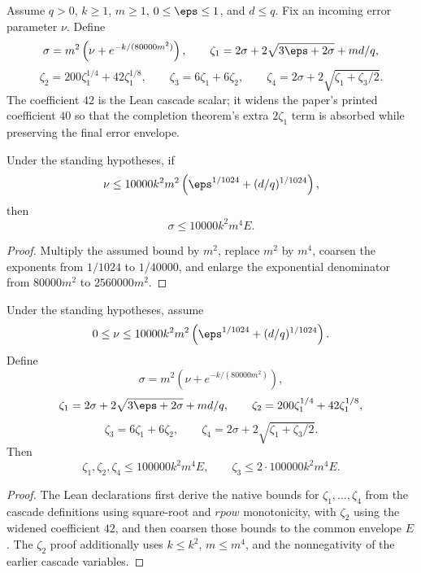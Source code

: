 \begin{definition}\label{def:main-formal-error-cascade}
	\leanok
	Assume $q > 0$, $k \ge 1$, $m \ge 1$, $0 \le \eps \le 1$, and $d \le q$. Fix an incoming error parameter $\nu$. Define
	\[
		\sigma = m^2\left(\nu + e^{-k/(80000m^2)}\right),
		\qquad
		\zeta_1 = 2\sigma + 2\sqrt{3\eps+2\sigma} + md/q,
	\]
	\[
		\zeta_2 = 200\zeta_1^{1/4} + 42\zeta_1^{1/8},
		\qquad
		\zeta_3 = 6\zeta_1 + 6\zeta_2,
		\qquad
		\zeta_4 = 2\sigma + 2\sqrt{\zeta_1+\zeta_3/2}.
	\]
	The coefficient $42$ is the Lean cascade scalar; it widens the paper's printed
	coefficient $40$ so that the completion theorem's extra $2\zeta_1$ term is
	absorbed while preserving the final error envelope.
\end{definition}

\begin{theorem}\label{thm:sigma-bound-main-formal}
	\leanok
	Under the standing hypotheses, if
	\[
		\nu \le 10000k^2m^2\left(\eps^{1/1024} + (d/q)^{1/1024}\right),
	\]
	then
	\[
		\sigma \le 10000k^2m^4 E.
	\]
\end{theorem}
\begin{proof}
	\leanok
	Multiply the assumed bound by $m^2$, replace $m^2$ by $m^4$, coarsen the exponents from $1/1024$ to $1/40000$, and enlarge the exponential denominator from $80000m^2$ to $2560000m^2$.
\end{proof}

\begin{theorem}\label{thm:zeta-bounds-main-formal}
	\leanok
	Under the standing hypotheses, assume
	\[
		0 \le \nu \le 10000k^2m^2\left(\eps^{1/1024} + (d/q)^{1/1024}\right).
	\]
	Define
	\[
		\sigma = m^2\left(\nu + e^{-k/(80000m^2)}\right),
	\]
	\[
		\zeta_1 = 2\sigma + 2\sqrt{3\eps + 2\sigma} + md/q,
		\qquad
		\zeta_2 = 200\zeta_1^{1/4} + 42\zeta_1^{1/8},
	\]
	\[
		\zeta_3 = 6\zeta_1 + 6\zeta_2,
		\qquad
		\zeta_4 = 2\sigma + 2\sqrt{\zeta_1 + \zeta_3/2}.
	\]
	Then
	\[
		\zeta_1, \zeta_2, \zeta_4 \le 100000k^2m^4 E,
		\qquad
		\zeta_3 \le 2 \cdot 100000k^2m^4 E.
	\]
\end{theorem}
\begin{proof}
	\leanok
	The Lean declarations first derive the native bounds for $\zeta_1,\dots,\zeta_4$
	from the cascade definitions using square-root and $rpow$ monotonicity, with
	$\zeta_2$ using the widened coefficient $42$, and then coarsen those bounds to
	the common envelope $E$. The $\zeta_2$ proof additionally uses $k \le k^2$,
	$m \le m^4$, and the nonnegativity of the earlier cascade variables.
\end{proof}

